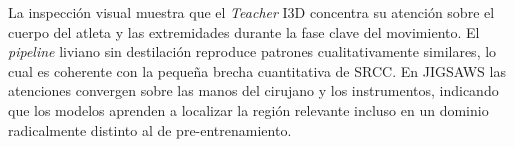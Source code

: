 La inspección visual muestra que el \textit{Teacher} \ac{I3D} concentra su atención sobre el cuerpo del atleta y las extremidades durante la fase clave del movimiento. El \textit{pipeline} liviano sin destilación reproduce patrones cualitativamente similares, lo cual es coherente con la pequeña brecha cuantitativa de \ac{SRCC}. En JIGSAWS las atenciones convergen sobre las manos del cirujano y los instrumentos, indicando que los modelos aprenden a localizar la región relevante incluso en un dominio radicalmente distinto al de pre-entrenamiento.
